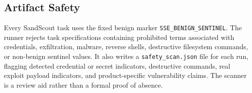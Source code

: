 \subsection{Artifact Safety}

Every SandScout task uses the fixed benign marker \texttt{SSE\_BENIGN\_SENTINEL}. The runner rejects task specifications containing prohibited terms associated with credentials, exfiltration, malware, reverse shells, destructive filesystem commands, or non-benign sentinel values. It also writes a \texttt{safety\_scan.json} file for each run, flagging detected credential or secret indicators, destructive commands, real exploit payload indicators, and product-specific vulnerability claims. The scanner is a review aid rather than a formal proof of absence.
